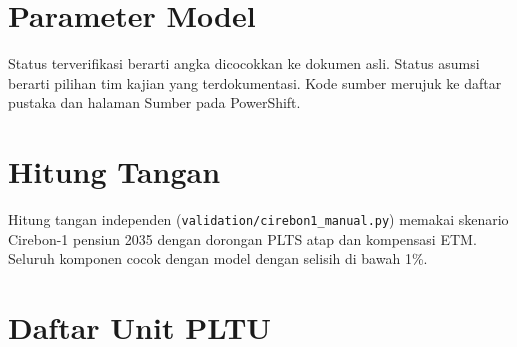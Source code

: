 \section{Parameter Model}
\label{lamp:asumsi}

Status terverifikasi berarti angka dicocokkan ke dokumen asli. Status asumsi berarti pilihan tim kajian yang terdokumentasi. Kode sumber merujuk ke daftar pustaka dan halaman Sumber pada PowerShift.

{\small

}

\section{Hitung Tangan}
\label{lamp:hitung}

Hitung tangan independen (\texttt{validation/cirebon1\_manual.py}) memakai skenario Cirebon-1 pensiun 2035 dengan dorongan PLTS atap dan kompensasi ETM. Seluruh komponen cocok dengan model dengan selisih di bawah 1\%.

\begin{table}[H]
\centering
\small

\end{table}

\section{Daftar Unit PLTU}
\label{lamp:unit}

{\small

}
